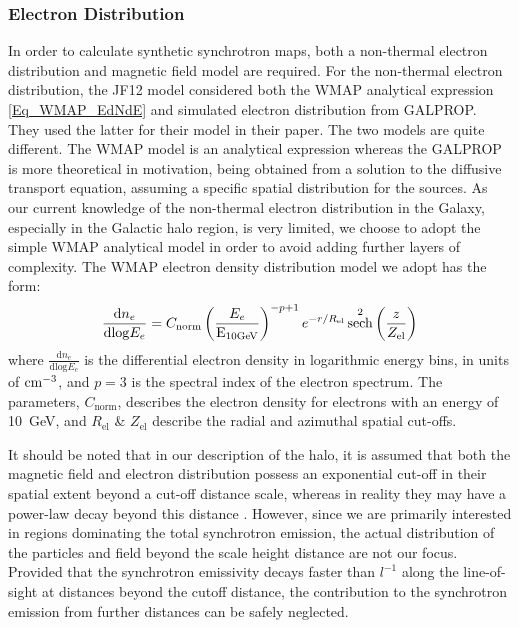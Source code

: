 \documentclass[usenatbib]{mnras}
\DeclareMathOperator{\sech}{sech}
\begin{document}
\subsubsection{Electron Distribution}

In order to calculate synthetic synchrotron maps, both a non-thermal electron distribution and magnetic field model are required. For the non-thermal electron distribution, the JF12 model considered both the WMAP analytical expression \ref{Eq_WMAP_EdNdE} and simulated electron distribution from GALPROP. They used the latter for their model in their paper. The two models are quite different. The WMAP \cite{WMAP_Page} model is an analytical expression whereas the GALPROP \cite{Hammurabi} is more theoretical in motivation, being obtained from a solution to the diffusive transport equation, assuming a specific spatial distribution for the sources. As our current knowledge of the non-thermal electron distribution in the Galaxy, especially in the Galactic halo region, is very limited, we choose to adopt the simple WMAP analytical model in order to avoid adding further layers of complexity. The WMAP electron density distribution model we adopt has the form:
\begin{equation}\label{Eq_WMAP_EdNdE}
    \frac{\mathrm{d}n_e}{\mathrm{dlog}E_{e}} =     C_\mathrm{norm} \left(\frac{E_e}{\rm E_{\rm 10 GeV}}\right)^{-p+1} e^{-r/R_{\mathrm{el}}} \sech^2\left(\frac{z}{Z_{\mathrm{el}}}\right) 
\end{equation}
where $\frac{\mathrm{d}n_e}{\mathrm{dlog}E_{e}}$ is the differential electron density in logarithmic energy bins, in units of ${\rm cm}^{-3}$, and $p =3$ is the spectral index of the electron spectrum. The parameters, $C_\mathrm{norm}$, describes the electron density for electrons with an energy of 10~GeV, and $R_{\mathrm{el}}$ \& $Z_{\mathrm{el}}$ describe the radial and azimuthal spatial cut-offs. 

It should be noted that in our description of the halo, it is assumed that both the magnetic field and electron distribution possess an exponential cut-off in their spatial extent beyond a cut-off distance scale, whereas in reality they may have a power-law decay beyond this distance \cite{Drury_2012} \cite{Hammurabi} \cite{Eck_2015}. However, since we are primarily interested in regions dominating the total synchrotron emission, the actual distribution of the particles and field beyond the scale height distance are not our focus. Provided that the synchrotron emissivity decays faster than $l^{-1}$ along the line-of-sight at distances beyond the cutoff distance, the contribution to the synchrotron emission from further distances can be safely neglected. 
\end{document}
